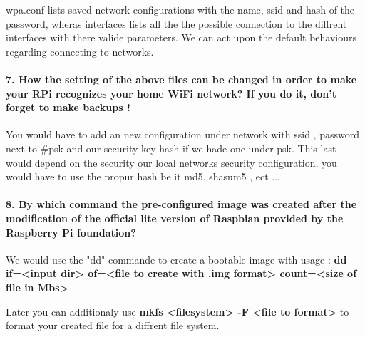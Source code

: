 \documentclass[10pt,a4paper]{article}
\begin{document}
wpa.conf lists saved network configurations with the name, ssid and hash of the password, wheras interfaces lists all the the possible connection to the diffrent interfaces with there valide parameters. We can act upon the default behaviours regarding connecting to networks.
\paragraph{7. How the setting of the above files can be changed in order to make your RPi recognizes your home
WiFi network? If you do it, don’t forget to make backups !}\vspace{0.5cm}

You would have to add an new configuration under network with ssid , password next to \#psk and our security key hash if we hade one under psk. This last would depend on the security our local networks security configuration, you would have to use the propur hash be it md5, shasum5 , ect ...
\paragraph{8. By which command the pre-configured image was created after the modification of the official lite
version of Raspbian provided by the Raspberry Pi foundation?}\vspace{0.5cm}

We would use the "dd" commande to create a bootable image with usage :
\textbf{dd if=<input dir> of=<file to create with .img format> count=<size of file in Mbs>} .\vspace{0.5cm}

Later you can additionaly use \textbf{mkfs <filesystem> -F <file to format>} to format your created file for a diffrent file system.
\end{document}
